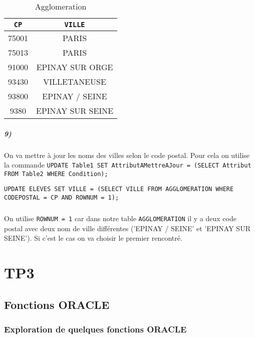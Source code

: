\documentclass{report}
\begin{document}
\begin{table}[H]
	\center
	\begin{tabular}{|c|c|}
		\hline
		\verb+CP+ & \verb+VILLE+ \\
		\hline
		75001 & PARIS \\
		\hline
		75013 & PARIS \\
		\hline
		91000 & EPINAY SUR ORGE \\
		\hline
		93430 & VILLETANEUSE \\
		\hline
		93800 & EPINAY / SEINE \\
		\hline
		9380 & EPINAY SUR SEINE \\
		\hline
	\end{tabular}
	\caption{Agglomeration}
\end{table}

\paragraph{9)}On va mettre à jour les noms des villes selon le code postal. Pour cela on utilise la commande {\tt UPDATE Table1 SET AttributAMettreAJour = (SELECT Attribut FROM Table2 WHERE Condition);}

\begin{lstlisting}
UPDATE ELEVES SET VILLE = (SELECT VILLE FROM AGGLOMERATION WHERE CODEPOSTAL = CP AND ROWNUM = 1);
\end{lstlisting}

\paragraph{}On utilise {\tt ROWNUM = 1} car dans notre table {\tt AGGLOMERATION} il y a deux code postal avec deux nom de ville différentes ('EPINAY / SEINE' et 'EPINAY SUR SEINE'). Si c'est le cas on va choisir le premier rencontré.


\chapter{TP3}

\section{Fonctions ORACLE}

\subsection{Exploration de quelques fonctions ORACLE}
\end{document}
